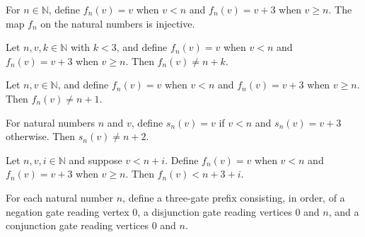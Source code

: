 \begin{theorem}
\label{BoolCircuit.shiftPrefix_injective}
\leanok
{}
For $n\in\mathbb{N}$, define $f_n(v)=v$ when $v<n$ and $f_n(v)=v+3$ when $v\ge n$. The
map $f_n$ on the natural numbers is injective.
\end{theorem}

\begin{theorem}
\label{BoolCircuit.shiftPrefix_ne}
\leanok
{}
Let $n,v,k\in\mathbb{N}$ with $k<3$, and define $f_n(v)=v$ when $v<n$ and $f_n(v)=v+3$
when $v\ge n$. Then $f_n(v)\ne n+k$.
\end{theorem}

\begin{theorem}
\label{BoolCircuit.shiftPrefix_ne_one}
\leanok
{}
Let $n,v\in\mathbb{N}$, and define $f_n(v)=v$ when $v<n$ and $f_n(v)=v+3$ when $v\ge n$.
Then $f_n(v)\ne n+1$.
\end{theorem}

\begin{theorem}
\label{BoolCircuit.shiftPrefix_ne_two}
\leanok
{}
For natural numbers $n$ and $v$, define $s_n(v)=v$ if $v<n$ and $s_n(v)=v+3$ otherwise.
Then $s_n(v)\ne n+2$.
\end{theorem}

\begin{theorem}
\label{BoolCircuit.shiftPrefix_lt}
\leanok
{}
Let $n,v,i\in\mathbb{N}$ and suppose $v<n+i$. Define $f_n(v)=v$ when $v<n$ and
$f_n(v)=v+3$ when $v\ge n$. Then $f_n(v)<n+3+i$.
\end{theorem}

\begin{definition}
\label{BoolCircuit.constPrefix}
\leanok
{}
For each natural number $n$, define a three-gate prefix consisting, in order, of a
negation gate reading vertex $0$, a disjunction gate reading vertices $0$ and $n$, and a
conjunction gate reading vertices $0$ and $n$.
\end{definition}

